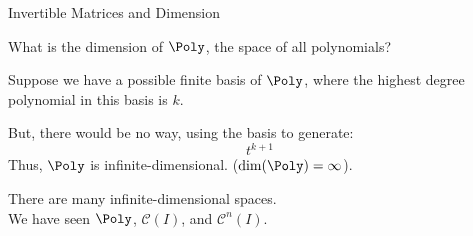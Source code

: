 \documentclass{beamer}
\begin{document}
\begin{frame}{Invertible Matrices and Dimension}
\begin{example}
What is the dimension of $\Poly$, the space of all polynomials?\pause

\vspace{0.25cm}
Suppose we have a possible finite basis of $\Poly$, where the highest degree polynomial in this basis is $k$.\pause

\vspace{0.25cm}
But, there would be no way, using the basis to generate:
\begin{equation*}
t^{k+1}
\end{equation*}\pause
Thus, $\Poly$ is infinite-dimensional. ($\dim(\Poly)=\infty$).
\end{example}\pause

\begin{block}{}
There are many infinite-dimensional spaces.\\We have seen $\Poly$, $\mathcal{C}(I)$, and $\mathcal{C}^n(I)$.
\end{block}
\end{frame}
\end{document}
